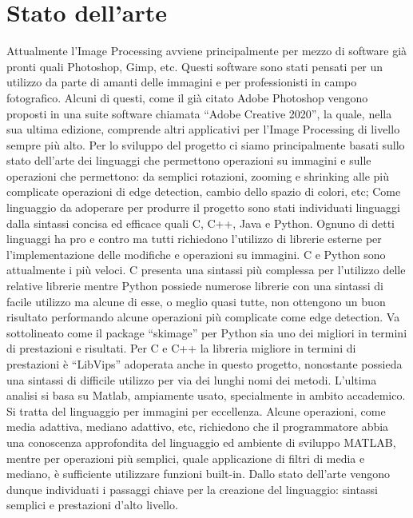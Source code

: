 \documentclass[10pt]{article}
\begin{document}
\section{Stato dell'arte}Attualmente l’Image Processing avviene principalmente per mezzo di software già pronti quali Photoshop, Gimp, etc. Questi software sono stati pensati per un utilizzo da parte di amanti delle immagini e per professionisti in campo fotografico. Alcuni di questi, come il già citato Adobe Photoshop vengono proposti in una suite software chiamata “Adobe Creative 2020”, la quale, nella sua ultima edizione, comprende altri applicativi per l’Image Processing di livello sempre più alto.
Per lo sviluppo del progetto ci siamo principalmente basati sullo stato dell’arte dei linguaggi che permettono operazioni su immagini e sulle operazioni che permettono: da semplici  rotazioni, zooming e shrinking alle più complicate operazioni di edge detection, cambio dello spazio di colori, etc;\newline
Come linguaggio da adoperare per produrre il progetto sono stati individuati linguaggi dalla sintassi concisa ed efficace quali C, C++, Java e Python. Ognuno di detti linguaggi ha pro e contro ma tutti richiedono l’utilizzo di librerie esterne per l’implementazione delle modifiche e operazioni su immagini. C e Python sono attualmente i più veloci. C presenta una sintassi più complessa per l’utilizzo delle relative librerie mentre Python possiede numerose librerie con una sintassi di facile utilizzo ma alcune di esse, o meglio quasi tutte, non ottengono un buon risultato performando alcune operazioni più complicate come edge detection. Va sottolineato come il package “skimage” per Python sia uno dei migliori in termini di prestazioni e risultati. Per C e C++ la libreria migliore in termini di prestazioni è “LibVips” adoperata anche in questo progetto, nonostante possieda una sintassi di difficile utilizzo per via dei lunghi nomi dei metodi. L’ultima analisi si basa su Matlab, ampiamente usato, specialmente in ambito accademico. Si tratta del linguaggio per immagini per eccellenza. Alcune operazioni, come media adattiva, mediano adattivo, etc, richiedono che il programmatore abbia una conoscenza approfondita del linguaggio ed ambiente di sviluppo MATLAB, mentre per operazioni più semplici, quale applicazione di filtri di media e mediano, è sufficiente utilizzare funzioni built-in.
Dallo stato dell’arte vengono dunque individuati i passaggi chiave per la creazione del linguaggio: sintassi semplici e prestazioni d’alto livello.
\clearpage
\end{document}
